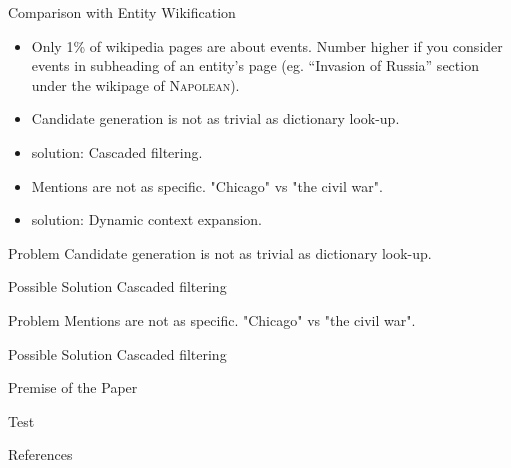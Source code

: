 
\begin{frame}{Comparison with Entity Wikification}

\begin{itemize}
\item Only 1\% of wikipedia pages are about events. Number higher if you consider events in subheading of an entity's page (eg. ``Invasion of Russia'' section under the wikipage of \textsc{Napolean}).
\item Candidate generation is not as trivial as dictionary look-up.
\pause
\item {\color{red}solution:} Cascaded filtering.
\pause
\item Mentions are not as specific. "Chicago" vs "the civil war".
\pause
\item {\color{red}solution:} Dynamic context expansion.
\end{itemize}
\end{frame}

\begin{frame}
\begin{block}{Problem}
Candidate generation is not as trivial as dictionary look-up.
\end{block}
\begin{exampleblock}{Possible Solution}
Cascaded filtering
\end{exampleblock}
\begin{block}{Problem}
Mentions are not as specific. "Chicago" vs "the civil war".
\end{block}
\begin{exampleblock}{Possible Solution}
Cascaded filtering
\end{exampleblock}
\end{frame}

\begin{frame}{Premise of the Paper}
\begin{example}
Test
\end{example}
\end{frame}






\begin{frame}[allowframebreaks]{References}
\def\newblock{}


\end{frame}


